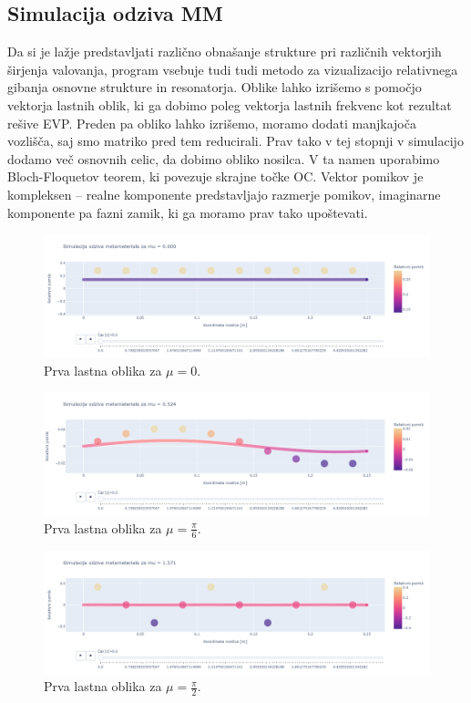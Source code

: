 \documentclass[12pt]{report}
\begin{document}
\subsection{Simulacija odziva \ac{MM}}
Da si je lažje predstavljati različno obnašanje strukture pri različnih vektorjih širjenja valovanja, program vsebuje tudi tudi metodo za vizualizacijo relativnega gibanja osnovne strukture
in resonatorja. Oblike lahko izrišemo s pomočjo vektorja lastnih oblik, ki ga dobimo poleg vektorja lastnih frekvenc kot rezultat rešive \ac{EVP}. Preden pa obliko lahko izrišemo, moramo dodati manjkajoča
vozlišča, saj smo matriko pred tem reducirali. Prav tako v tej stopnji v simulacijo dodamo več osnovnih celic, da dobimo obliko nosilca. V ta namen uporabimo Bloch-Floquetov teorem, ki povezuje skrajne točke \ac{OC}.
Vektor pomikov je kompleksen -- realne komponente predstavljajo razmerje pomikov, imaginarne komponente pa fazni zamik, ki ga moramo prav tako upoštevati. 
\begin{figure}[H]
  \centering
  \includegraphics[trim={0 4cm 0 3.5cm},clip, scale=0.3]{Images/Metamaterial_oblika_1_mu_0.000.png}
  \caption{Prva lastna oblika za $\mu = 0$.}
\end{figure}
\begin{figure}[H]
  \centering
  \includegraphics[trim={0 4cm 0 3.5cm},clip, scale=0.3]{Images/Metamaterial_oblika_1_mu_0.524.png}
  \caption{Prva lastna oblika za $\mu = \frac{\pi}{6}$.}
\end{figure}
\begin{figure}[H]
  \centering
  \includegraphics[trim={0 4cm 0 3.5cm},clip, scale=0.3]{Images/Metamaterial_oblika_1_mu_1.571.png}
  \caption{Prva lastna oblika za $\mu = \frac{\pi}{2}$.}
\end{figure}
\end{document}
